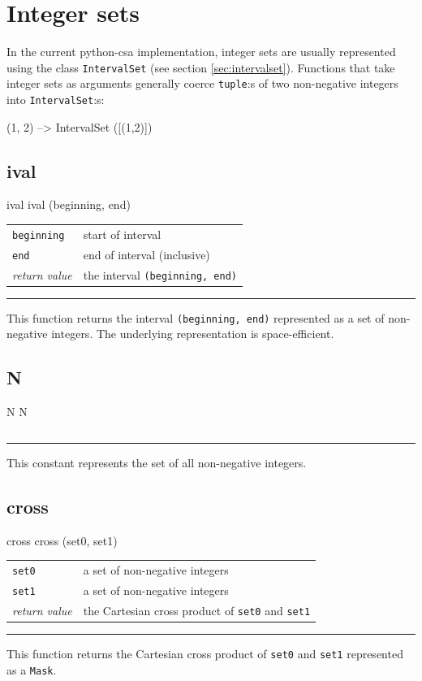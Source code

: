 \documentclass[a4paper,twoside]{report}
\makeatletter
\newenvironment{parameters}%
{\begin{tabular}{@{\hspace{2em}}lp{0.6\textwidth}}}%
{\end{tabular}\par\vspace{1mm}\par\hrule\par\vspace{5mm}}
\newcommand{\cls}[1]{\lstinline|#1|}
\newcommand{\fa}[1]{\lstinline|#1|}
\makeatother
\begin{document}
\section{Integer sets}
In the current python-csa implementation, integer sets are usually
represented using the class \cls{IntervalSet} (see section
\ref{sec:intervalset}).  Functions that take integer sets as arguments
generally coerce \cls{tuple}:s of two non-negative integers into
\cls{IntervalSet}:s:
\begin{code}{}
  (1, 2) --> IntervalSet ([(1,2)])
\end{code}

\subsection{ival}

\begin{head}{ival}
  ival (beginning, end)
\end{head}
\begin{parameters}
  \lstinline|beginning| &%
  start of interval\\
  \lstinline|end| &%
  end of interval (inclusive)\\
  \emph{return value} &%
  the interval \lstinline|(beginning, end)|\\
\end{parameters}
This function returns the interval \lstinline|(beginning, end)|
represented as a set of non-negative integers.  The underlying
representation is space-efficient.

\subsection{N}

\begin{head}{N}
  N
\end{head}
\begin{parameters}
\end{parameters}
This constant represents the set of all non-negative integers.

\subsection{cross}

\begin{head}{cross}
  cross (set0, set1)
\end{head}
\begin{parameters}
  \lstinline|set0| &%
  a set of non-negative integers\\
  \lstinline|set1| &%
  a set of non-negative integers\\
  \emph{return value} &%
  the Cartesian cross product of \fa{set0} and \fa{set1}\\
\end{parameters}
This function returns the Cartesian cross product of \fa{set0} and
\fa{set1} represented as a \cls{Mask}.
\end{document}
